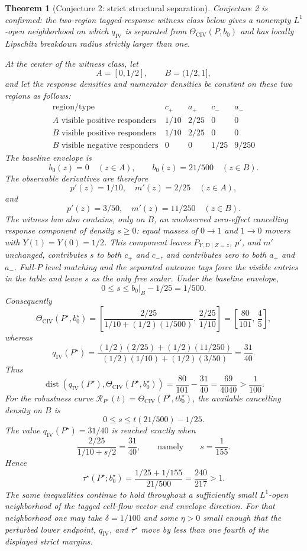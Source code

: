 \documentclass[11pt]{article}
\theoremstyle{definition}
\theoremstyle{plain}
\newtheorem{theorem}{Theorem}
\theoremstyle{remark}
\begin{document}
\begin{theorem}[Conjecture 2: strict structural separation]\label{thm:strict-separation}
Conjecture 2 is confirmed: the two-region tagged-response witness class below gives a nonempty \(L^1\)-open neighborhood on which \(q_{\mathrm{IV}}\) is separated from \(\Theta_{\mathrm{CIV}}(P,b_0)\) and has locally Lipschitz breakdown radius strictly larger than one.

At the center of the witness class, let
\[
A=[0,1/2],\qquad B=(1/2,1],
\]
and let the response densities and numerator densities be constant on these two regions as follows:
\[
\begin{array}{c|c|c|c|c}
\text{region/type} & c_+ & a_+ & c_- & a_-\\
\hline
A\text{ visible positive responders} & 1/10 & 2/25 & 0 & 0\\
B\text{ visible positive responders} & 1/10 & 2/25 & 0 & 0\\
B\text{ visible negative responders} & 0 & 0 & 1/25 & 9/250
\end{array}
\]
The baseline envelope is
\[
b_0(z)=0\quad(z\in A),\qquad b_0(z)=21/500\quad(z\in B).
\]
The observable derivatives are therefore
\[
p'(z)=1/10,\quad m'(z)=2/25\quad(z\in A),
\]
and
\[
p'(z)=3/50,\quad m'(z)=11/250\quad(z\in B).
\]
The witness law also contains, only on \(B\), an unobserved zero-effect cancelling response component of density \(s\ge0\): equal masses of \(0\to1\) and \(1\to0\) movers with \(Y(1)=Y(0)=1/2\).  This component leaves \(P_{Y,D\mid Z=z}\), \(p'\), and \(m'\) unchanged, contributes \(s\) to both \(c_+\) and \(c_-\), and contributes zero to both \(a_+\) and \(a_-\).  Full-\(P\) level matching and the separated outcome tags force the visible entries in the table and leave \(s\) as the only free scalar.  Under the baseline envelope,
\[
0\le s\le b_0|_B-1/25=1/500.
\]
Consequently
\[
\Theta_{\mathrm{CIV}}(P^\star,b_0^\star)
=
\left[
\frac{2/25}{1/10+(1/2)(1/500)},\,
\frac{2/25}{1/10}
\right]
=
\left[\frac{80}{101},\,\frac45\right],
\]
whereas
\[
q_{\mathrm{IV}}(P^\star)
=
\frac{(1/2)(2/25)+(1/2)(11/250)}
     {(1/2)(1/10)+(1/2)(3/50)}
=\frac{31}{40}.
\]
Thus
\[
\operatorname{dist}\!\left(q_{\mathrm{IV}}(P^\star),
\Theta_{\mathrm{CIV}}(P^\star,b_0^\star)\right)
=
\frac{80}{101}-\frac{31}{40}
=\frac{69}{4040}
>\frac1{100}.
\]
For the robustness curve \(\mathcal R_{P^\star}(t)=\Theta_{\mathrm{CIV}}(P^\star,tb_0^\star)\), the available cancelling density on \(B\) is
\[
0\le s\le t(21/500)-1/25.
\]
The value \(q_{\mathrm{IV}}(P^\star)=31/40\) is reached exactly when
\[
\frac{2/25}{1/10+s/2}=\frac{31}{40},
\qquad\text{namely}\qquad s=\frac1{155}.
\]
Hence
\[
\tau^\star(P^\star;b_0^\star)
=
\frac{1/25+1/155}{21/500}
=\frac{240}{217}>1.
\]
The same inequalities continue to hold throughout a sufficiently small
\(L^1\)-open neighborhood of the tagged cell-flow vector and envelope direction.
For that neighborhood one may take \(\delta=1/100\) and some \(\eta>0\) small
enough that the perturbed lower endpoint, \(q_{\mathrm{IV}}\), and
\(\tau^\star\) move by less than one fourth of the displayed strict margins.
\end{theorem}
\end{document}
